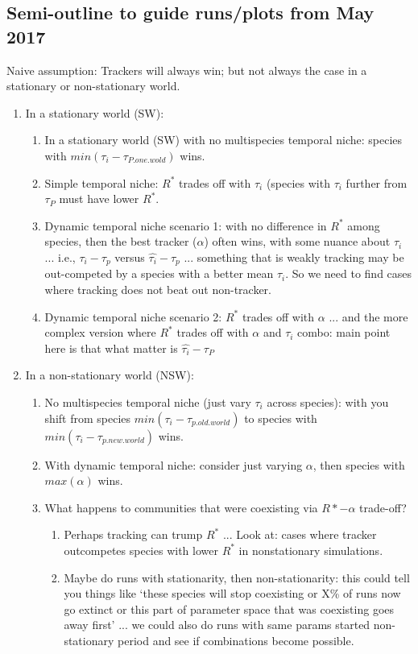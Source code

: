 \documentclass[11pt,letterpaper]{article}
\begin{document}
\subsection{Semi-outline to guide runs/plots from May 2017} Naive assumption: Trackers will always win; but not always the case in a stationary or non-stationary world. 

\begin{enumerate} 
\item In a stationary world (SW):
\begin{enumerate} 
\item In a stationary world (SW) with no multispecies temporal niche: species with $min(\tau_i - \tau_{P.one.wold})$ wins. 
\item  Simple temporal niche: $R^*$ trades off with $\tau_i$ (species with $\tau_i$ further from $\tau_P$ must have lower $R^*$.
\item Dynamic temporal niche scenario 1: with no difference in $R^*$ among species, then the best tracker ($\alpha$) often wins, with some nuance about $\tau_i$ ... i.e., $\tau_i - \tau_p$ versus $\hat{\tau_i} - \tau_p$ ... something that is weakly tracking may be out-competed by a species with a better mean $\tau_i$. So we need to find cases where tracking does not beat out non-tracker. 
\item  Dynamic temporal niche scenario 2:  $R^*$ trades off with $\alpha$ ... and the more complex version where $R^*$ trades off with $\alpha$ and $\tau_i$ combo: main point here is that what matter is $\hat{\tau_i}-\tau_P$
\end{enumerate} 
\item  In a non-stationary world (NSW):
\begin{enumerate} 
\item No multispecies temporal niche (just vary $\tau_i$ across species): with you shift from species $min(\tau_i - \tau_{p.old.world})$ to species with $min(\tau_i - \tau_{p.new.world})$ wins. 
\item With dynamic temporal niche: consider just varying $\alpha$, then species with $max(\alpha)$ wins. 
\item What happens to communities that were coexisting via $R*-\alpha$ trade-off? 
\begin{enumerate}
\item Perhaps tracking can trump $R^*$ ... Look at: cases where tracker outcompetes species with lower $R^*$ in nonstationary simulations.
\item Maybe do runs with stationarity, then non-stationarity: this could tell you things like `these species will stop coexisting or X\% of runs now go extinct or this part of parameter space that was coexisting goes away first' ... we could also do runs with same params started non-stationary period and see if combinations become possible. 
\end{enumerate} 
\end{enumerate} 
\end{enumerate} 
\end{document}
